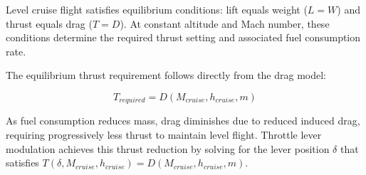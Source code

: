 Level cruise flight satisfies equilibrium conditions: lift equals weight ($L = W$) and thrust equals drag ($T = D$). At constant altitude and Mach number, these conditions determine the required thrust setting and associated fuel consumption rate.

The equilibrium thrust requirement follows directly from the drag model:

\begin{equation}
T_{required} = D(M_{cruise}, h_{cruise}, m)
\end{equation}

As fuel consumption reduces mass, drag diminishes due to reduced induced drag, requiring progressively less thrust to maintain level flight. Throttle lever modulation achieves this thrust reduction by solving for the lever position $\delta$ that satisfies $T(\delta, M_{cruise}, h_{cruise}) = D(M_{cruise}, h_{cruise}, m)$.

 
